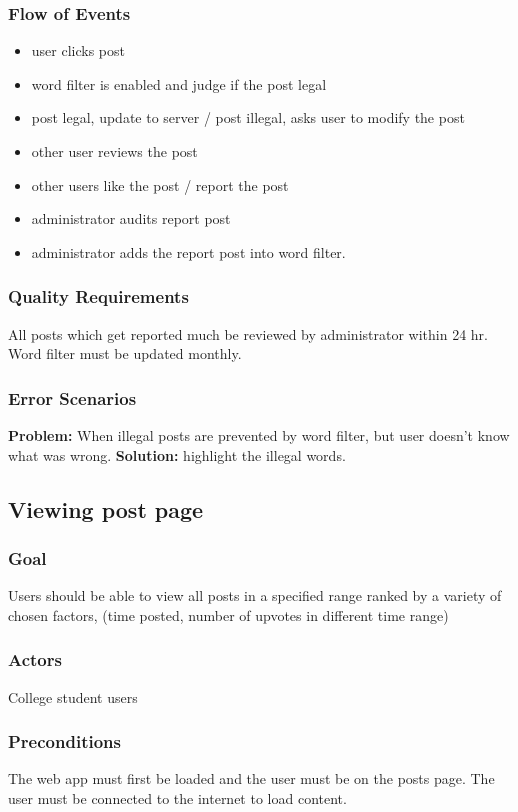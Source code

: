 \documentclass[12pt]{article}
\begin{document}
  \subsubsection{Flow of Events}
  \begin{itemize}
    \item user clicks post
    \item word filter is enabled and judge if the post legal
    \item post legal, update to server / post illegal,  asks user to modify the post
    \item  other user reviews the post
    \item  other users like the post / report the post
    \item administrator audits report post
    \item administrator adds the report post into word filter.
  \end{itemize}

  \subsubsection{Quality Requirements}
  All posts which get reported much be reviewed by administrator within 24 hr.
  Word filter must be updated monthly.


  \subsubsection{Error Scenarios}
  \textbf{Problem:}
  When illegal posts are prevented by word filter, but user doesn’t know what was wrong.
  \textbf{Solution:}
  highlight the illegal words.

\subsection{Viewing post page}

  \subsubsection{Goal}
  Users should be able to view all posts in a specified range ranked by a variety of chosen factors, (time posted, number of upvotes in different time range)
  \subsubsection{Actors}
  College student users

  \subsubsection{Preconditions}
  The web app must first be loaded and the user must be on the posts page. The user must be connected to the internet to load content.
\end{document}
